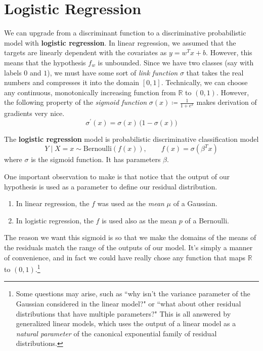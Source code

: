 \section{Logistic Regression} 

  We can upgrade from a discriminant function to a discriminative probabilistic model with \textbf{logistic regression}. In linear regression, we assumed that the targets are linearly dependent with the covariates as $y = w^T x + b$. However, this means that the hypothesis $f_w$ is unbounded. Since we have two classes (say with labels $0$ and $1$), we must have some sort of \textit{link function} $\sigma$ that takes the real numbers and compresses it into the domain $[0, 1]$. Technically, we can choose any continuous, monotonically increasing function from $\mathbb{R}$ to $(0, 1)$. However, the following property of the \textit{sigmoid function} $\sigma(x) \coloneqq \frac{1}{1 + e^{x}}$ makes derivation of gradients very nice. \begin{equation}
    \sigma^\prime (x) = \sigma(x) \, \big(1 - \sigma(x) \big)
  \end{equation}

  \begin{definition}
    The \textbf{logistic regression} model is probabilistic discriminative classification model  
    \begin{equation}
      Y \mid X = x \sim \mathrm{Bernoulli}(f(x)), \qquad f(x) = \sigma(\beta^T x)
    \end{equation}
    where $\sigma$ is the sigmoid function. It has parameters $\beta$. 
  \end{definition} 

  One important observation to make is that notice that the output of our hypothesis is used as a parameter to define our residual distribution. 
  \begin{enumerate}
    \item In linear regression, the $f$ was used as the \textit{mean} $\mu$ of a Gaussian. 
    \item In logistic regression, the $f$ is used also as the mean $p$ of a Bernoulli. 
  \end{enumerate}
  The reason we want this sigmoid is so that we make the domains of the means of the residuals match the range of the outputs of our model. It's simply a manner of convenience, and in fact we could have really chose any function that maps $\mathbb{R}$ to $(0, 1)$.\footnote{Some questions may arise, such as ``why isn't the variance parameter of the Gaussian considered in the linear model?" or ``what about other residual distributions that have multiple parameters?" This is all answered by generalized linear models, which uses the output of a linear model as a \textit{natural parameter} of the canonical exponential family of residual distributions. }

